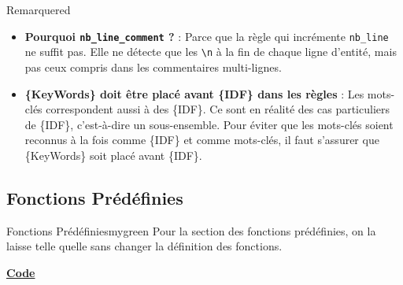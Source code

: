 \newpage

\begin{prettyBox}{Remarque}{red}
\begin{itemize}
    \item \textbf{Pourquoi \texttt{nb\_line\_comment} ?} : Parce que la règle qui incrémente 
        \texttt{nb\_line} ne suffit pas. Elle ne détecte que les \texttt{\textbackslash n} 
        à la fin de chaque ligne d'entité, mais pas ceux compris dans les commentaires multi-lignes. 
 
\item \textbf{\{KeyWords\} doit être placé avant \{IDF\} dans les règles} :  
        Les mots-clés correspondent aussi à des \{IDF\}. Ce sont en réalité des cas particuliers  
        de \{IDF\}, c'est-à-dire un sous-ensemble. Pour éviter que les mots-clés soient reconnus  
        à la fois comme \{IDF\} et comme mots-clés, il faut s'assurer que \{KeyWords\} soit placé  
        avant \{IDF\}.  
\end{itemize}
\end{prettyBox}

\vspace{0.5cm}
\subsection{Fonctions Prédéfinies}
\begin{prettyBox}{Fonctions Prédéfinies}{mygreen}
Pour la section des fonctions prédéfinies, on la laisse telle quelle sans changer la définition des fonctions.
\end{prettyBox}

\vspace{1cm}
\textbf{\underline{Code}}

\vspace{0.25cm}


















